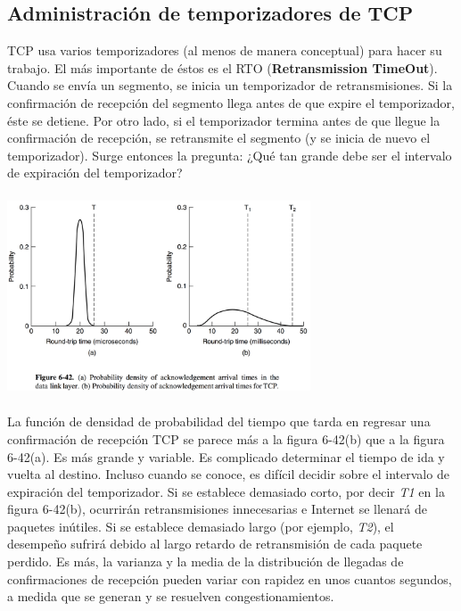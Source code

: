 \documentclass[10pt,a4paper]{report}
\begin{document}
\subsection{Administración de temporizadores de TCP}

	\par TCP usa varios temporizadores (al menos de manera conceptual) para hacer su trabajo. El más importante de éstos es el RTO (\textbf{Retransmission TimeOut}). Cuando se envía un segmento, se inicia un temporizador de retransmisiones. Si la confirmación de recepción del segmento llega antes de que expire el temporizador, éste se detiene. Por otro lado, si el temporizador termina antes de que llegue la confirmación de recepción, se retransmite el segmento (y se inicia de nuevo el temporizador). Surge entonces la pregunta: ¿Qué tan grande debe ser el intervalo de expiración del temporizador?

	\begin{center}
		\includegraphics[width=9cm, height=6cm]{./imagenes/temporalizador.png}
	\end{center}

	\par La función de densidad de probabilidad del tiempo que tarda en regresar una confirmación de recepción TCP se parece más a la figura 6-42(b) que a la figura 6-42(a). Es más grande y variable. Es complicado determinar el tiempo de ida y vuelta al destino. Incluso cuando se conoce, es difícil decidir sobre el intervalo de expiración del temporizador. Si se establece demasiado corto, por decir \textit{T1} en la figura 6-42(b), ocurrirán retransmisiones innecesarias e Internet se llenará de paquetes inútiles. Si se establece demasiado largo (por ejemplo, \textit{T2}), el desempeño sufrirá debido al largo retardo de retransmisión de cada paquete perdido. Es más, la varianza y la media de la distribución de llegadas de confirmaciones de recepción pueden variar con rapidez en unos cuantos segundos, a medida que se generan y se resuelven congestionamientos.
\end{document}
